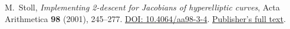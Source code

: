 M.~Stoll, \emph{Implementing 2-descent for Jacobians of hyperelliptic
curves}, Acta Arithmetica \textbf{98} (2001), 245--277.
\href{https://doi.org/10.4064/aa98-3-4}{DOI: 10.4064/aa98-3-4}.
\href{https://www.impan.pl/shop/en/publication/transaction/download/product/83397}{Publisher's full text}.
